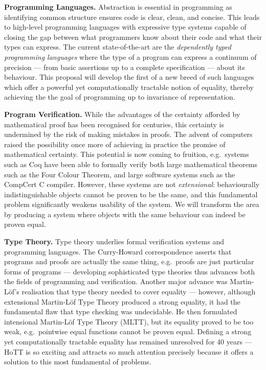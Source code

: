 \documentclass[a4paper,11pt]{article}
\newcommand{\eg}{{e.g.}\ }
\begin{document}
{\bf Programming Languages.} Abstraction is essential in programming
as identifying common structure ensures code is clear, clean, and
concise. This leads to high-level programming languages with
expressive type systems capable of closing the gap between what
programmers know about their code and what their types can express.
The current state-of-the-art are the {\em dependently typed
  programming languages} where the type of a program can express a
continuum of precision --- from basic assertions up to a complete
specification --- about its behaviour. This proposal will develop the
first of a new breed of such languages which offer a powerful yet
computationally tractable notion of equality, thereby achieving the
the goal of programming up to invariance of representation.


{\bf Program Verification.} While the advantages of the certainty
afforded by mathematical proof has been recognised for centuries, this
certainty is undermined by the risk of making mistakes in
proofs. The advent of computers raised the possibility once more of
achieving in practice the promise of mathematical certainty. This
potential is now coming to fruition, \eg systems such as Coq have been
able to formally verify both large mathematical theorems such as the
Four Colour Theorem, and large software systems such as the CompCert
C compiler. However, these systems are not {\em extensional}:
behaviourally indistinguishable objects cannot be proven to be the
same, and this fundamental problem significantly weakens usability of the
system. We will transform the area by producing a system where
objects with the same behaviour can indeed be proven equal.


{\bf Type Theory.} Type theory underlies formal verification systems
and programming languages. The Curry-Howard correspondence asserts
that programs and proofs are actually the same thing, \eg proofs are
just particular forms of programs --- developing sophisticated type
theories thus advances both the fields of programming and
verification. Another major advance was Martin-L\"of's realisation
that type theory needed to cover equality --- however, although
extensional Martin-L\"of Type Theory produced a strong equality, it
had the fundamental flaw that type checking was undecidable. He then
formulated intensional Martin-L\"of Type Theory (MLTT), but its
equality proved to be too weak, \eg pointwise equal functions cannot
be proven equal. Defining a strong yet computationally tractable
equality has remained unresolved for 40 years --- HoTT is so exciting
and attracts so much attention precisely because it offers a solution
to this most fundamental of problems.
\end{document}
